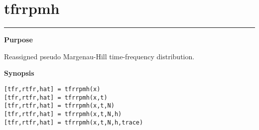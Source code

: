 

\section*{\hspace*{-1.6cm} tfrrpmh}

\vspace*{-.4cm}
\hspace*{-1.6cm}\rule[0in]{16.5cm}{.02cm}
\vspace*{.2cm}

{\bf \large \sf Purpose}\\
\hspace*{1.5cm}
\begin{minipage}[t]{13.5cm}
Reassigned pseudo Margenau-Hill time-frequency distribution.
\end{minipage}
\vspace*{.5cm}

{\bf \large \sf Synopsis}\\
\hspace*{1.5cm}
\begin{minipage}[t]{13.5cm}
\begin{verbatim}
[tfr,rtfr,hat] = tfrrpmh(x) 
[tfr,rtfr,hat] = tfrrpmh(x,t) 
[tfr,rtfr,hat] = tfrrpmh(x,t,N) 
[tfr,rtfr,hat] = tfrrpmh(x,t,N,h) 
[tfr,rtfr,hat] = tfrrpmh(x,t,N,h,trace) 
\end{verbatim}
\end{minipage}
\vspace*{.5cm}

